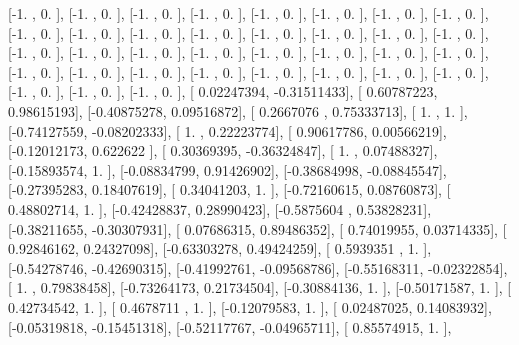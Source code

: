 \documentclass{article}
\begin{document}
       [-1.        ,  0.        ],
       [-1.        ,  0.        ],
       [-1.        ,  0.        ],
       [-1.        ,  0.        ],
       [-1.        ,  0.        ],
       [-1.        ,  0.        ],
       [-1.        ,  0.        ],
       [-1.        ,  0.        ],
       [-1.        ,  0.        ],
       [-1.        ,  0.        ],
       [-1.        ,  0.        ],
       [-1.        ,  0.        ],
       [-1.        ,  0.        ],
       [-1.        ,  0.        ],
       [-1.        ,  0.        ],
       [-1.        ,  0.        ],
       [-1.        ,  0.        ],
       [-1.        ,  0.        ],
       [-1.        ,  0.        ],
       [-1.        ,  0.        ],
       [-1.        ,  0.        ],
       [-1.        ,  0.        ],
       [-1.        ,  0.        ],
       [-1.        ,  0.        ],
       [-1.        ,  0.        ],
       [-1.        ,  0.        ],
       [-1.        ,  0.        ],
       [-1.        ,  0.        ],
       [-1.        ,  0.        ],
       [-1.        ,  0.        ],
       [-1.        ,  0.        ],
       [-1.        ,  0.        ],
       [-1.        ,  0.        ],
       [-1.        ,  0.        ],
       [-1.        ,  0.        ],
       [ 0.02247394, -0.31511433],
       [ 0.60787223,  0.98615193],
       [-0.40875278,  0.09516872],
       [ 0.2667076 ,  0.75333713],
       [ 1.        ,  1.        ],
       [-0.74127559, -0.08202333],
       [ 1.        ,  0.22223774],
       [ 0.90617786,  0.00566219],
       [-0.12012173,  0.622622  ],
       [ 0.30369395, -0.36324847],
       [ 1.        ,  0.07488327],
       [-0.15893574,  1.        ],
       [-0.08834799,  0.91426902],
       [-0.38684998, -0.08845547],
       [-0.27395283,  0.18407619],
       [ 0.34041203,  1.        ],
       [-0.72160615,  0.08760873],
       [ 0.48802714,  1.        ],
       [-0.42428837,  0.28990423],
       [-0.5875604 ,  0.53828231],
       [-0.38211655, -0.30307931],
       [ 0.07686315,  0.89486352],
       [ 0.74019955,  0.03714335],
       [ 0.92846162,  0.24327098],
       [-0.63303278,  0.49424259],
       [ 0.5939351 ,  1.        ],
       [-0.54278746, -0.42690315],
       [-0.41992761, -0.09568786],
       [-0.55168311, -0.02322854],
       [ 1.        ,  0.79838458],
       [-0.73264173,  0.21734504],
       [-0.30884136,  1.        ],
       [-0.50171587,  1.        ],
       [ 0.42734542,  1.        ],
       [ 0.4678711 ,  1.        ],
       [-0.12079583,  1.        ],
       [ 0.02487025,  0.14083932],
       [-0.05319818, -0.15451318],
       [-0.52117767, -0.04965711],
       [ 0.85574915,  1.        ],
\end{document}
